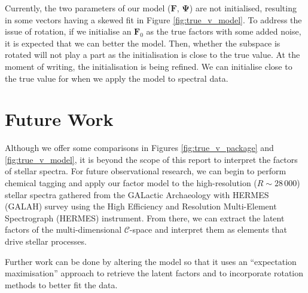 \documentclass[12pt, letterpaper]{article}
\begin{document}
Currently, the two parameters of our model ($\mathbf{F}$, $\mathbf{\Psi}$) are not initialised, resulting in some vectors having a skewed fit in Figure \ref{fig:true_v_model}. To address the issue of rotation, if we initialise an $\mathbf{F}_0$ as the true factors with some added noise, it is expected that we can better the model. Then, whether the subspace is rotated will not play a part as the initialisation is close to the true value. At the moment of writing, the initialisation is being refined. We can initialise close to the true value for when we apply the model to spectral data.

%





\section{Future Work}

Although we offer some comparisons in Figures \ref{fig:true_v_package} and \ref{fig:true_v_model}, it is beyond the scope of this report to interpret the factors of stellar spectra. For future observational research, we can begin to perform chemical tagging and apply our factor model to the high-resolution ($R\sim 28\,000$) stellar spectra gathered from the GALactic Archaeology with HERMES (GALAH) survey using the High Efficiency and Resolution Multi-Element Spectrograph (HERMES) instrument. From there, we can extract the latent factors of the multi-dimensional $\mathcal{C}$-space and interpret them as elements that drive stellar processes.

Further work can be done by altering the model so that it uses an ``expectation maximisation'' approach to retrieve the latent factors and to incorporate rotation methods to better fit the data.
\end{document}
